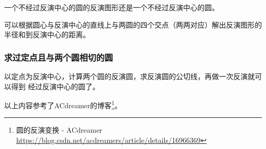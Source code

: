 \begin{property}
	一个不经过反演中心的圆的反演图形还是一个不经过反演中心的圆。
\end{property}
可以根据圆心与反演中心的直线上与两圆的四个交点（两两对应）解出反演图形的
半径和到反演中心的距离。

\subsubsection{求过定点且与两个圆相切的圆}
以定点为反演中心，计算两个圆的反演圆，求反演圆的公切线，再做一次反演就可以得到
经过反演中心的圆了。

以上内容参考了ACdreamer的博客\footnote{
	圆的反演变换 - ACdreamer
	\url{https://blog.csdn.net/acdreamers/article/details/16966369}
}。
